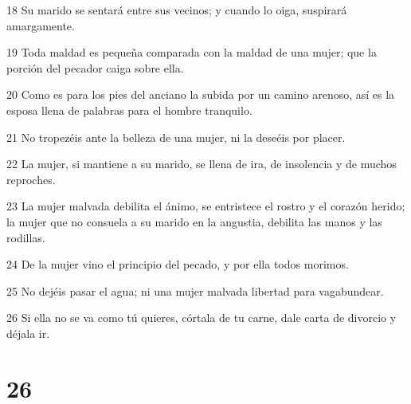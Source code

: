 \par 18 Su marido se sentará entre sus vecinos; y cuando lo oiga, suspirará amargamente.
\par 19 Toda maldad es pequeña comparada con la maldad de una mujer; que la porción del pecador caiga sobre ella.
\par 20 Como es para los pies del anciano la subida por un camino arenoso, así es la esposa llena de palabras para el hombre tranquilo.
\par 21 No tropezéis ante la belleza de una mujer, ni la deseéis por placer.
\par 22 La mujer, si mantiene a su marido, se llena de ira, de insolencia y de muchos reproches.
\par 23 La mujer malvada debilita el ánimo, se entristece el rostro y el corazón herido; la mujer que no consuela a su marido en la angustia, debilita las manos y las rodillas.
\par 24 De la mujer vino el principio del pecado, y por ella todos morimos.
\par 25 No dejéis pasar el agua; ni una mujer malvada libertad para vagabundear.
\par 26 Si ella no se va como tú quieres, córtala de tu carne, dale carta de divorcio y déjala ir.

\chapter{26}


